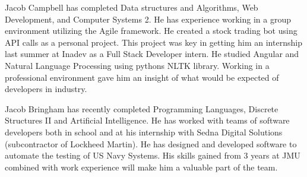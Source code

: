 \documentclass[11pt]{article}
\begin{document}
Jacob Campbell has completed Data structures and Algorithms, Web Development, and Computer Systems 2. He has experience working in a group environment utilizing the Agile framework. He created a stock trading bot using API calls as a personal project. This project was key in getting him an internship last summer at Inadev as a Full Stack Developer intern. He studied Angular and Natural Language Processing using pythons NLTK library. Working in a professional environment gave him an insight of what would be expected of developers in industry.

Jacob Bringham has recently completed Programming Languages, Discrete Structures II and Artificial Intelligence. He has worked with teams of software developers both in school and at his internship with Sedna Digital Solutions (subcontractor of Lockheed Martin). He has designed and developed software to automate the testing of US Navy Systems. His skills gained from 3 years at JMU combined with work experience will make him a valuable part of the team.
\end{document}
